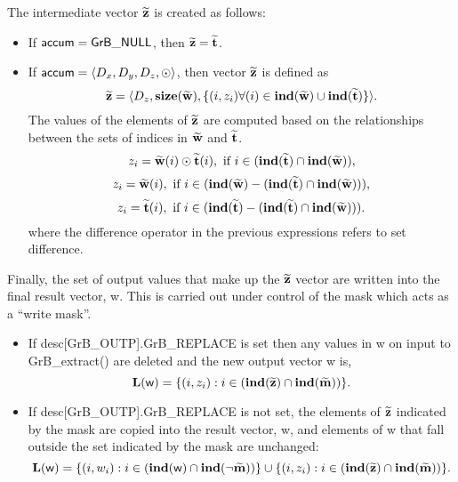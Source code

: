 The intermediate vector ${\bf \widetilde{z}}$ is created as follows:
\begin{itemize}
    \item If ${\sf accum} = {\sf GrB\_NULL}$, then 
    ${\bf \widetilde{z}} = {\bf \widetilde{t}}$.

    \item If ${\sf accum} = \langle D_x, D_y, D_z, \odot \rangle$, then vector 
    ${\bf \widetilde{z}}$ is defined as 
        \[ {\bf \widetilde{z}} = \langle D_z, \bold{size}({\bf \widetilde{w}}), 
		\{(i,z_{i})  \forall (i) \in \bold{ind}({\bf \widetilde{w}}) \cup 
        \bold{ind}({\bf \widetilde{t}}) \} \rangle.\]
    The values of the elements of ${\bf \widetilde{z}}$ are computed based on the relationships between the sets of indices in ${\bf \widetilde{w}}$ and ${\bf \widetilde{t}}$.
\[
z_{i} = {\bf \widetilde{w}}(i) \odot {\bf \widetilde{t}}(i), \ \mbox{if}\  i \in  (\bold{ind}({\bf \widetilde{t}}) \cap \bold{ind}({\bf \widetilde{w}})),
\]
\[
z_{i} = {\bf \widetilde{w}}(i), \ \mbox{if}\  i \in  (\bold{ind}({\bf \widetilde{w}}) - (\bold{ind}({\bf \widetilde{t}}) \cap \bold{ind}({\bf \widetilde{w}}))),
\]
\[
z_{i} = {\bf \widetilde{t}}(i), \ \mbox{if}\  i \in  (\bold{ind}({\bf \widetilde{t}}) - (\bold{ind}({\bf \widetilde{t}}) \cap \bold{ind}({\bf \widetilde{w}}))).
\]
where the difference operator in the previous expressions refers to set difference.
\end{itemize}

Finally, the set of output values that make up the ${\bf \widetilde{z}}$ 
vector are written into the final result vector, {\sf w}. 
This is carried out under control of the mask which acts as a ``write mask''.
\begin{itemize}
\item If {\sf desc[GrB\_OUTP].GrB\_REPLACE} is set then any values in {\sf w} 
on input to {\sf GrB\_extract()} are deleted and the new output vector {\sf w} is,
\[ \bold{L}({\sf w}) = \{(i,z_{i}) : i \in (\bold{ind}({\bf \widetilde{z}}) 
\cap \bold{ind}({\bf \widetilde{m}})) \}. \]

\item If {\sf desc[GrB\_OUTP].GrB\_REPLACE} is not set, the elements of 
${\bf \widetilde{z}}$ indicated by 
the mask are copied into the result vector, {\sf w}, and elements of 
{\sf w} that fall outside the set indicated by the mask are unchanged:
\[ \bold{L}({\sf w}) = \{(i,w_{i}) : i \in (\bold{ind}({\sf w}) 
\cap \bold{ind}(\neg {\bf \widetilde{m}})) \} \cup \{(i,z_{i}) : i \in 
(\bold{ind}({\bf \widetilde{z}}) \cap \bold{ind}({\bf \widetilde{m}})) \}. \]
\end{itemize}

